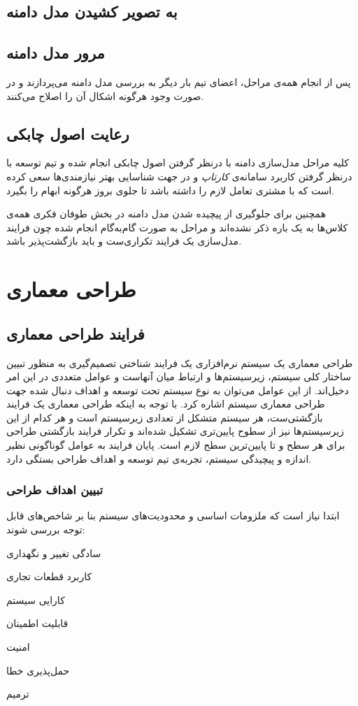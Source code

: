 \documentclass[12pt,svgnames,oneside]{book}
\newcounter{itemadded}
\let\LaTeXStandardEnumerateBegin\enumerate
\let\LaTeXStandardEnumerateEnd\endenumerate
\renewenvironment{enumerate}{%
\LaTeXStandardEnumerateBegin%
\setcounter{itemadded}{0}
}{%
\LaTeXStandardEnumerateEnd%
}%
\begin{document}
\section{به تصویر کشیدن مدل دامنه}


\section{مرور مدل دامنه}
پس از انجام همه‌ی مراحل، اعضای تیم بار دیگر به بررسی مدل دامنه می‌پردازند و در صورت وجود هرگونه اشکال آن را اصلاح می‌کنند.

\section{رعایت اصول چابکی}
کلیه مراحل مدل‌سازی دامنه با درنظر گرفتن اصول چابکی انجام شده و تیم توسعه با درنظر گرفتن کاربرد سامانه‌ی \textit{کارتاپ} و در جهت شناسایی بهتر نیازمندی‌ها سعی کرده است که با مشتری تعامل لازم را داشته باشد تا جلوی بروز هرگونه ابهام را بگیرد.

همچنین برای جلوگیری از پیچیده‌ شدن مدل دامنه در بخش طوفان فکری همه‌ی کلاس‌ها به یک باره ذکر نشده‌اند و مراحل به صورت گام‌به‌گام انجام شده چون فرایند مدل‌سازی یک فرایند تکراری‌ست و باید بازگشت‌پذیر باشد.

\chapter{طراحی معماری}

\section{فرایند طراحی معماری}	
طراحی معماری یک سیستم نرم‌افزاری یک فرایند شناختی تصمیم‌گیری به منظور تبیین ساختار کلی سیستم، زیرسیستم‌ها و ارتباط میان آنهاست و عوامل متعددی در این امر دخیل‌اند. از این عوامل می‌توان به نوع سیستم تحت توسعه و اهداف دنبال شده جهت طراحی معماری سیستم اشاره کرد. با توجه به اینکه طراحی معماری یک فرایند بازگشتی‌ست، هر سیستم متشکل از تعدادی زیرسیستم است و هر کدام از این زیرسیستم‌ها نیز از سطوح پایین‌تری تشکیل شده‌اند و تکرار فرایند بازگشتی طراحی برای هر سطح و تا پایین‌ترین سطح لازم است. پایان فرایند به عوامل گوناگونی نظیر اندازه و پیچیدگی سیستم، تجربه‌ی تیم توسعه و اهداف طراحی بستگی دارد.

\subsection{تبیین اهداف طراحی}			
ابتدا نیاز است که ملزومات اساسی و محدودیت‌های سیستم بنا بر شاخص‌های قابل توجه بررسی شوند:
\begin{enumerate}
\item
سادگی تغییر و نگهداری
\item
کاربرد قطعات تجاری
\item
کارایی سیستم
\item
قابلیت اطمینان
\item
امنیت
\item
حمل‌پذیری خطا
\item
ترمیم
\end{enumerate}
\end{document}
